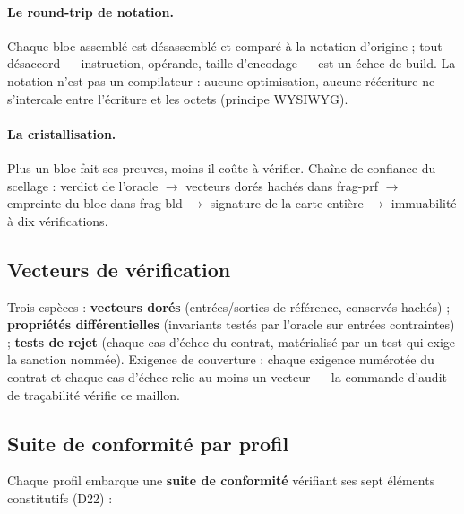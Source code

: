 \paragraph{Le round-trip de notation.} Chaque bloc assemblé est désassemblé et comparé à
la notation d’origine ; tout désaccord — instruction, opérande, taille d’encodage — est un
échec de build. La notation n’est pas un compilateur : aucune optimisation, aucune
réécriture ne s’intercale entre l’écriture et les octets (principe WYSIWYG).

\paragraph{La cristallisation.} Plus un bloc fait ses preuves, moins il coûte à vérifier.
Chaîne de confiance du scellage : verdict de l’oracle $\to$ vecteurs dorés hachés dans
frag-prf $\to$ empreinte du bloc dans frag-bld $\to$ signature de la carte entière $\to$
immuabilité à dix vérifications.

\subsection{Vecteurs de vérification}\label{sec:vecteurs}

Trois espèces : \textbf{vecteurs dorés} (entrées/sorties de référence, conservés hachés) ;
\textbf{propriétés différentielles} (invariants testés par l’oracle sur entrées
contraintes) ; \textbf{tests de rejet} (chaque cas d’échec du contrat, matérialisé par un
test qui exige la sanction nommée). Exigence de couverture : chaque exigence numérotée du
contrat et chaque cas d’échec relie au moins un vecteur — la commande d’audit de
traçabilité vérifie ce maillon.

\subsection{Suite de conformité par profil}\label{sec:conformite}

Chaque profil embarque une \textbf{suite de conformité} vérifiant ses sept éléments
constitutifs (D22) :

